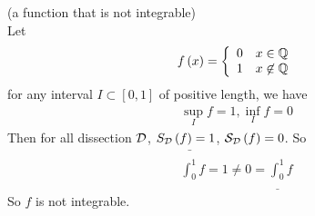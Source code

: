 \documentclass[a4paper]{article}
\begin{document}
\begin{eg} (a function that is not integrable)\\
Let
\begin{equation*}
\begin{aligned}
f\left(x\right) = \left\{
\begin{array}{ll}
0 & x\in \mathbb{Q}\\
1 & x\not\in \mathbb{Q}
\end{array}
\right.
\end{aligned}
\end{equation*}
for any interval $I\subset \left[0,1\right]$ of positive length, we have
\begin{equation*}
\begin{aligned}
\sup_I f = 1, \inf_I f = 0
\end{aligned}
\end{equation*}
Then for all dissection $\mathcal{D}$, $S_{\mathcal{D}}\left(f\right)=1$, $\mathcal{S}_{\mathcal{D}}\left(f\right)=0$. So
\begin{equation*}
\begin{aligned}
\bar{\int_0^1}f = 1 \neq 0 = \underline{\int_0^1} f
\end{aligned}
\end{equation*}
So $f$ is not integrable.
\end{eg}
\end{document}

